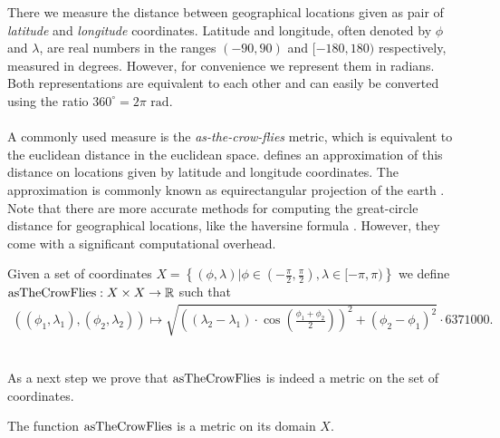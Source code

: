 	There we measure the distance between geographical locations given as pair of \textit{latitude} and \textit{longitude} coordinates.
	Latitude and longitude, often denoted by $\phi$ and $\lambda$, are real numbers in the ranges $(-90, 90)$ and $[-180, 180)$ respectively,
	measured in degrees. However, for convenience we represent them in radians. Both representations are equivalent to each other
	and can easily be converted using the ratio $360^\circ = 2 \pi \text{ rad}$.\\\\
	A commonly used measure is the \textit{as-the-crow-flies} metric, which is equivalent to the euclidean distance in the euclidean space.
	 defines an approximation of this distance on locations given by latitude and longitude coordinates.
	The approximation is commonly known as equirectangular projection of the earth .
	Note that there are more accurate methods for computing the great-circle distance for geographical locations,
	like the haversine formula . However, they come with a significant computational overhead.
	\begin{mydef}\label{asTheCrowFlies}
		Given a set of coordinates $X = \left\{(\phi, \lambda) | \phi \in \left(-\frac{\pi}{2}, \frac{\pi}{2}\right), \lambda \in [-\pi, \pi)\right\}$ we define
		$\operatorname{asTheCrowFlies} : X \times X \to \mathbb{R}$ such that
		\begin{align*}
			\left(\left(\phi_1, \lambda_1\right), \left(\phi_2, \lambda_2\right)\right) \mapsto
				\sqrt{\left(\left(\lambda_2 - \lambda_1\right) \cdot \cos\left(\frac{\phi_1 + \phi_2}{2}\right)\right)^2
					+ \left(\phi_2 - \phi_1\right)^2} \cdot 6371000.
		\end{align*}
	\end{mydef}\quad\\
	As a next step we prove that $\operatorname{asTheCrowFlies}$ is indeed a metric on the set of coordinates.
	\begin{myproposition}
		The function $\operatorname{asTheCrowFlies}$ is a metric on its domain $X$.
	\end{myproposition}
